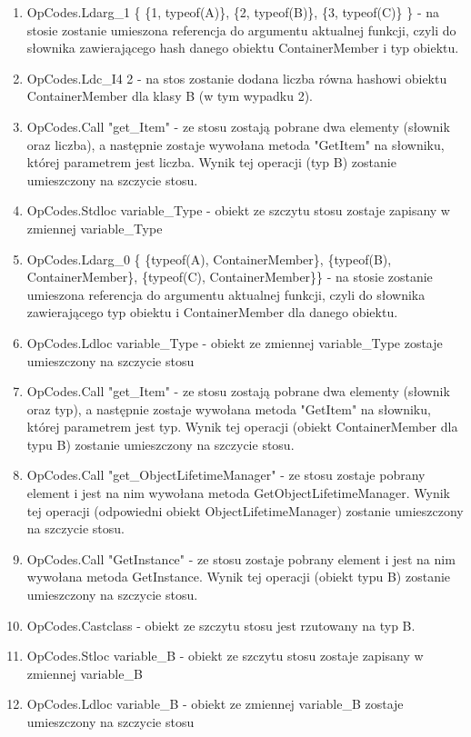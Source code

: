 \documentclass[12pt]{article}
\begin{document}
\begin{enumerate}
	\item OpCodes.Ldarg\_1 \{ \{1, typeof(A)\}, \{2, typeof(B)\}, \{3, typeof(C)\} \} - na stosie zostanie umieszona referencja do argumentu aktualnej funkcji, czyli do słownika zawierającego hash danego obiektu ContainerMember i typ obiektu.
	\item OpCodes.Ldc\_I4 2 - na stos zostanie dodana liczba równa hashowi obiektu ContainerMember dla klasy B (w tym wypadku 2).
	\item OpCodes.Call "get\_Item" - ze stosu zostają pobrane dwa elementy (słownik oraz liczba), a następnie zostaje wywołana metoda "GetItem" na słowniku, której parametrem jest liczba. Wynik tej operacji (typ B) zostanie umieszczony na szczycie stosu.
	\item OpCodes.Stdloc variable\_Type - obiekt ze szczytu stosu zostaje zapisany w zmiennej variable\_Type
	\item OpCodes.Ldarg\_0  \{ \{typeof(A), ContainerMember\}, \{typeof(B), ContainerMember\}, \{typeof(C), ContainerMember\}\} - na stosie zostanie umieszona referencja do argumentu aktualnej funkcji, czyli do słownika zawierającego typ obiektu i ContainerMember dla danego obiektu.
	\item OpCodes.Ldloc variable\_Type -  obiekt ze zmiennej variable\_Type zostaje umieszczony na szczycie stosu
	\item OpCodes.Call "get\_Item"  - ze stosu zostają pobrane dwa elementy (słownik oraz typ), a następnie zostaje wywołana metoda "GetItem" na słowniku, której parametrem jest typ. Wynik tej operacji (obiekt ContainerMember dla typu B) zostanie umieszczony na szczycie stosu.
	\item OpCodes.Call "get\_ObjectLifetimeManager" - ze stosu zostaje pobrany element i jest na nim wywołana metoda GetObjectLifetimeManager. Wynik tej operacji (odpowiedni obiekt ObjectLifetimeManager) zostanie umieszczony na szczycie stosu.
	\item OpCodes.Call "GetInstance" - ze stosu zostaje pobrany element i jest na nim wywołana metoda GetInstance. Wynik tej operacji (obiekt typu B) zostanie umieszczony na szczycie stosu.
	\item OpCodes.Castclass - obiekt ze szczytu stosu jest rzutowany na typ B.
	\item OpCodes.Stloc variable\_B - obiekt ze szczytu stosu zostaje zapisany w zmiennej variable\_B
	\item OpCodes.Ldloc variable\_B - obiekt ze zmiennej variable\_B zostaje umieszczony na szczycie stosu

\end{enumerate}
\end{document}
